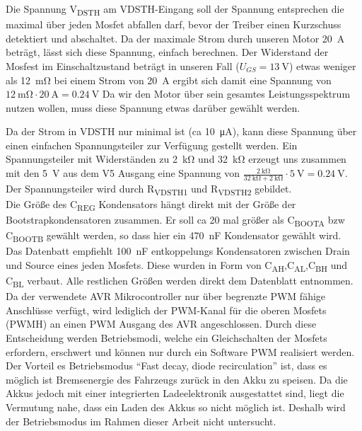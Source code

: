Die Spannung V\textsubscript{DSTH} am VDSTH-Eingang soll der Spannung entsprechen die maximal über jeden Mosfet abfallen darf, bevor der Treiber einen Kurzschuss detektiert 
und abschaltet. Da der maximale Strom durch unseren Motor \SI{20}{\ampere} beträgt, lässt sich diese Spannung, einfach berechnen. Der Widerstand der Mosfest im Einschaltzustand beträgt
in unseren Fall ($U_{GS}=\SI{13}{\V}$) etwas weniger als \SI{12}{\milli\ohm}  bei einem Strom von \SI{20}{\A} ergibt sich damit eine Spannung von $\SI{12}{\milli\ohm} \cdot \SI{20}{\A} = \SI{0,24}{\V}$
Da wir den Motor über sein gesamtes Leistungsspektrum nutzen wollen, muss diese Spannung etwas darüber gewählt werden.

Da der Strom in VDSTH nur minimal ist (ca \SI{10}{\micro\ampere}), kann diese Spannung über einen einfachen Spannungsteiler zur Verfügung gestellt werden. Ein Spannungsteiler mit 
Widerständen zu \SI{2}{\kilo\ohm} und \SI{32}{\kilo\ohm} erzeugt uns zusammen mit den \SI{5}{\volt} aus dem V5 Ausgang eine Spannung von $\frac{\SI{2}{\kilo\ohm}}{\SI{32}{\kilo\ohm}+\SI{2}{\kilo\ohm}}\cdot \SI{5}{\V} =\SI{0,24}{\V}$.
Der Spannungsteiler wird durch R\textsubscript{VDSTH1} und R\textsubscript{VDSTH2} gebildet.\\

Die Größe des C\textsubscript{REG} Kondensators hängt direkt mit der Größe der Bootstrapkondensatoren zusammen. Er soll ca 20 mal größer als
C\textsubscript{BOOTA} bzw C\textsubscript{BOOTB} gewählt werden, so dass hier ein \SI{470}{\nano\farad} Kondensator gewählt wird.\\

Das Datenbatt empfiehlt \SI{100}{\nano\farad} entkoppelungs Kondensatoren zwischen Drain und Source eines jeden Mosfets. Diese wurden in Form von C\textsubscript{AH},C\textsubscript{AL},C\textsubscript{BH} und C\textsubscript{BL} 
verbaut. Alle restlichen Größen werden direkt dem Datenblatt entnommen.\\

Da der verwendete AVR Mikrocontroller nur über begrenzte PWM fähige Anschlüsse verfügt, wird lediglich der PWM-Kanal für die oberen Mosfets (PWMH) an einen PWM Ausgang des AVR angeschlossen.
Durch diese Entscheidung werden Betriebsmodi, welche ein Gleichschalten der Mosfets erfordern, erschwert und können nur durch ein Software PWM realisiert werden. Der Vorteil es Betriebsmodus ``Fast decay, diode recirculation''
ist, dass es möglich ist Bremsenergie des Fahrzeugs zurück in den Akku zu speisen. Da die Akkus jedoch mit einer integrierten Ladeelektronik ausgestattet sind, liegt die Vermutung nahe, dass ein Laden des Akkus so nicht möglich ist.
Deshalb wird der Betriebsmodus im Rahmen dieser Arbeit nicht untersucht.

